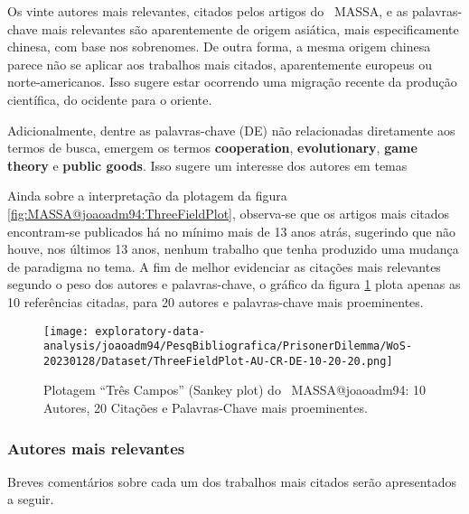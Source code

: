Os vinte autores mais relevantes, citados pelos artigos do \dataset\ MASSA, e as palavras-chave mais relevantes são aparentemente de origem asiática, mais especificamente chinesa, com base nos sobrenomes. De outra forma, a mesma origem chinesa parece não se aplicar aos trabalhos mais citados, aparentemente europeus ou norte-americanos. Isso sugere estar ocorrendo uma migração recente da produção científica, do ocidente para o oriente. 

Adicionalmente, dentre as palavras-chave (DE) não relacionadas diretamente aos termos de busca, emergem os termos \textbf{cooperation}, \textbf{evolutionary}, \textbf{game theory} e \textbf{public goods}. Isso sugere um interesse dos autores em temas

Ainda sobre a interpretação da plotagem da figura \ref{fig:MASSA@joaoadm94:ThreeFieldPlot}, observa-se que os artigos mais citados encontram-se publicados há no mínimo mais de 13 anos atrás, sugerindo que não houve, nos últimos 13 anos, nenhum trabalho que tenha produzido uma mudança de paradigma no tema.
A fim de melhor evidenciar as citações mais relevantes segundo o peso dos autores e palavras-chave, o gráfico da figura \ref{fig:MASSA@joaoadm94:ThreeFieldPlot:10-20-20} plota apenas as 10 referências citadas, para 20 autores e palavras-chave mais proeminentes.

\begin{figure}
    \centering
    \texttt{[image: exploratory-data-analysis/joaoadm94/PesqBibliografica/PrisonerDilemma/WoS-20230128/Dataset/ThreeFieldPlot-AU-CR-DE-10-20-20.png]}
    \caption{Plotagem ``Três Campos'' (Sankey plot) do \dataset\   MASSA@joaoadm94: 10 Autores, 20 Citações e Palavras-Chave mais proeminentes.}
    \label{fig:MASSA@joaoadm94:ThreeFieldPlot:10-20-20}
\end{figure}

\subsubsection{Autores mais relevantes\label{MASSA:Sankey:AutoresRelevantes}}

Breves comentários sobre cada um dos trabalhos mais citados serão apresentados a seguir.

